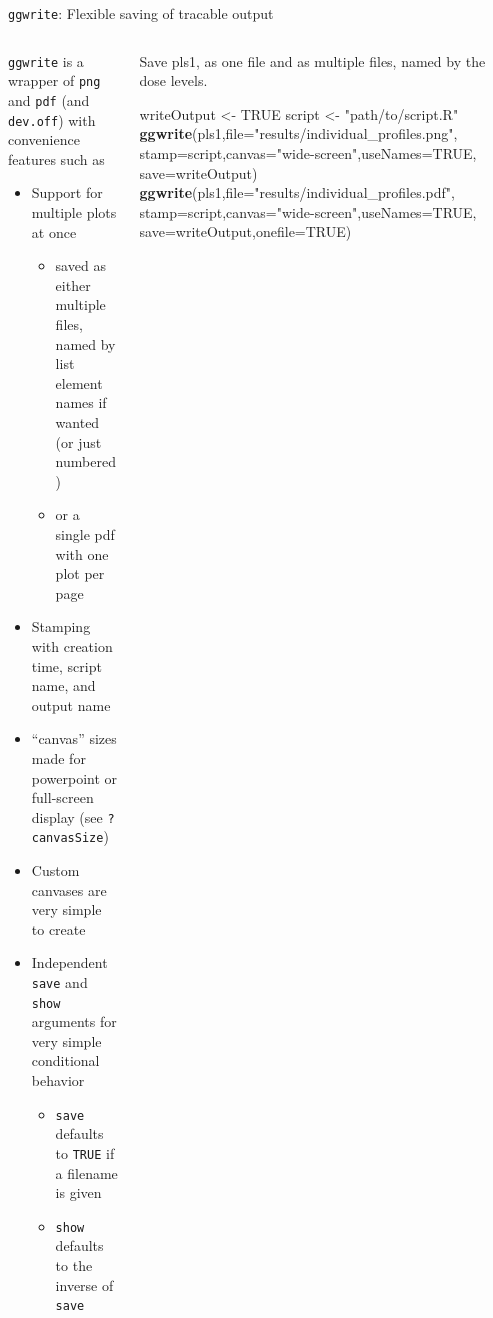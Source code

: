 \documentclass[
  8pt,
  ignorenonframetext,
  aspectratio=169]{beamer}
\newenvironment{Shaded}{\begin{snugshade}}{\end{snugshade}}
\newcommand{\DataTypeTok}[1]{\textcolor[rgb]{0.13,0.29,0.53}{#1}}
\newcommand{\KeywordTok}[1]{\textcolor[rgb]{0.13,0.29,0.53}{\textbf{#1}}}
\newcommand{\NormalTok}[1]{#1}
\newcommand{\OtherTok}[1]{\textcolor[rgb]{0.56,0.35,0.01}{#1}}
\newcommand{\StringTok}[1]{\textcolor[rgb]{0.31,0.60,0.02}{#1}}
\providecommand{\tightlist}{%
  \setlength{\itemsep}{0pt}\setlength{\parskip}{0pt}}
\begin{document}
\begin{frame}[fragile]{\texttt{ggwrite}: Flexible saving of tracable
output}
\protect\hypertarget{ggwrite-flexible-saving-of-tracable-output}{}
\begin{columns}[T]
\begin{column}{0.48\textwidth}
\texttt{ggwrite} is a wrapper of \texttt{png} and \texttt{pdf} (and
\texttt{dev.off}) with convenience features such as

\begin{itemize}
\tightlist
\item
  Support for multiple plots at once

  \begin{itemize}
  \tightlist
  \item
    saved as either multiple files, named by list element names if
    wanted (or just numbered)
  \item
    or a single pdf with one plot per page
  \end{itemize}
\item
  Stamping with creation time, script name, and output name
\item
  ``canvas'' sizes made for powerpoint or full-screen display (see
  \texttt{?canvasSize})
\item
  Custom canvases are very simple to create
\item
  Independent \texttt{save} and \texttt{show} arguments for very simple
  conditional behavior

  \begin{itemize}
  \tightlist
  \item
    \texttt{save} defaults to \texttt{TRUE} if a filename is given
  \item
    \texttt{show} defaults to the inverse of \texttt{save}
  \end{itemize}
\end{itemize}
\end{column}

\begin{column}{0.48\textwidth}
Save pls1, as one file and as multiple files, named by the dose levels.
\footnotesize

\begin{Shaded}
\begin{Highlighting}[]
\NormalTok{writeOutput \textless{}{-}}\StringTok{ }\OtherTok{TRUE}
\NormalTok{script \textless{}{-}}\StringTok{ "path/to/script.R"}
\KeywordTok{ggwrite}\NormalTok{(pls1,}\DataTypeTok{file=}\StringTok{"results/individual\_profiles.png"}\NormalTok{,}
        \DataTypeTok{stamp=}\NormalTok{script,}\DataTypeTok{canvas=}\StringTok{"wide{-}screen"}\NormalTok{,}\DataTypeTok{useNames=}\OtherTok{TRUE}\NormalTok{,}
        \DataTypeTok{save=}\NormalTok{writeOutput)}
\KeywordTok{ggwrite}\NormalTok{(pls1,}\DataTypeTok{file=}\StringTok{"results/individual\_profiles.pdf"}\NormalTok{,}
        \DataTypeTok{stamp=}\NormalTok{script,}\DataTypeTok{canvas=}\StringTok{"wide{-}screen"}\NormalTok{,}\DataTypeTok{useNames=}\OtherTok{TRUE}\NormalTok{,}
        \DataTypeTok{save=}\NormalTok{writeOutput,}\DataTypeTok{onefile=}\OtherTok{TRUE}\NormalTok{)}
\end{Highlighting}
\end{Shaded}


\end{column}
\end{columns}
\end{frame}
\end{document}
